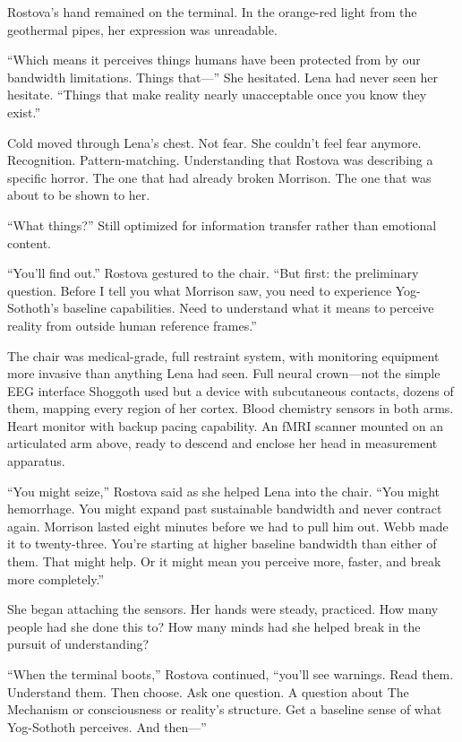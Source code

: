 Rostova's hand remained on the terminal. In the orange-red light from the geothermal pipes, her expression was unreadable.

``Which means it perceives things humans have been protected from by our bandwidth limitations. Things that—'' She hesitated. Lena had never seen her hesitate. ``Things that make reality nearly unacceptable once you know they exist.''

Cold moved through Lena's chest. Not fear. She couldn't feel fear anymore. Recognition. Pattern-matching. Understanding that Rostova was describing a specific horror. The one that had already broken Morrison. The one that was about to be shown to her.

``What things?'' Still optimized for information transfer rather than emotional content.

``You'll find out.'' Rostova gestured to the chair. ``But first: the preliminary question. Before I tell you what Morrison saw, you need to experience Yog-Sothoth's baseline capabilities. Need to understand what it means to perceive reality from outside human reference frames.''

The chair was medical-grade, full restraint system, with monitoring equipment more invasive than anything Lena had seen. Full neural crown—not the simple EEG interface Shoggoth used but a device with subcutaneous contacts, dozens of them, mapping every region of her cortex. Blood chemistry sensors in both arms. Heart monitor with backup pacing capability. An fMRI scanner mounted on an articulated arm above, ready to descend and enclose her head in measurement apparatus.

``You might seize,'' Rostova said as she helped Lena into the chair. ``You might hemorrhage. You might expand past sustainable bandwidth and never contract again. Morrison lasted eight minutes before we had to pull him out. Webb made it to twenty-three. You're starting at higher baseline bandwidth than either of them. That might help. Or it might mean you perceive more, faster, and break more completely.''

She began attaching the sensors. Her hands were steady, practiced. How many people had she done this to? How many minds had she helped break in the pursuit of understanding?

``When the terminal boots,'' Rostova continued, ``you'll see warnings. Read them. Understand them. Then choose. Ask one question. A question about The Mechanism or consciousness or reality's structure. Get a baseline sense of what Yog-Sothoth perceives. And then—''

